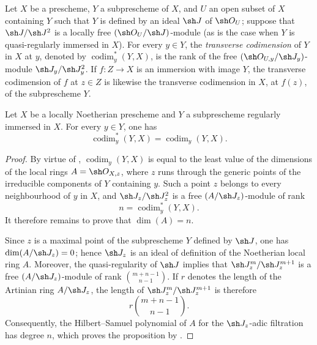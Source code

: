 \begin{definition}[19.1.3]
\label{IV.19.1.3}
Let $X$ be a prescheme, $Y$ a subprescheme of $X$, and $U$ an open subset of $X$ containing $Y$ such that $Y$ is defined by an ideal $\sh J$ of $\sh O_U$; suppose that $\sh J/\sh J^2$ is a locally free $(\sh O_U/\sh J)$-module (as is the case when $Y$ is quasi-regularly immersed in $X$). For every $y\in Y$, the \emph{transverse codimension} of $Y$ in $X$ at $y$, denoted by $\operatorname{codim}_y^*(Y,X)$, is the rank of the free $(\sh O_{U,y}/\sh J_y)$-module $\sh J_y/\sh J_y^2$. If $f:Z\to X$ is an immersion with image $Y$, the transverse codimension of $f$ at $z\in Z$ is likewise the transverse codimension in $X$, at $f(z)$, of the subprescheme $Y$.
\end{definition}

\begin{proposition}[19.1.4]
\label{IV.19.1.4}
Let $X$ be a locally Noetherian prescheme and $Y$ a subprescheme regularly immersed in $X$. For every $y\in Y$, one has
\begin{equation}
  \operatorname{codim}_y^*(Y,X)=\operatorname{codim}_y(Y,X).
  \tag{19.1.4.1}\label{IV.19.1.4.1}
\end{equation}
\end{proposition}

\begin{proof}
By virtue of , $\operatorname{codim}_y(Y,X)$ is equal to the least value of the dimensions of the local rings $A=\sh O_{X,z}$, where $z$ runs through the generic points of the irreducible components of $Y$ containing $y$. Such a point $z$ belongs to every neighbourhood of $y$ in $X$, and $\sh J_z/\sh J_z^2$ is a free $(A/\sh J_z)$-module of rank
\[
  n=\operatorname{codim}_y^*(Y,X).
\]
It therefore remains to prove that $\dim(A)=n$.


Since $z$ is a maximal point of the subprescheme $Y$ defined by $\sh J$, one has $\dim(A/\sh J_z)=0$; hence $\sh J_z$ is an ideal of definition of the Noetherian local ring $A$. Moreover, the quasi-regularity of $\sh J$ implies that $\sh J_z^m/\sh J_z^{m+1}$ is a free $(A/\sh J_z)$-module of rank $\binom{m+n-1}{n-1}$. If $r$ denotes the length of the Artinian ring $A/\sh J_z$, the length of $\sh J_z^m/\sh J_z^{m+1}$ is therefore
\[
  r\binom{m+n-1}{n-1}.
\]
Consequently, the Hilbert--Samuel polynomial of $A$ for the $\sh J_z$-adic filtration has degree $n$, which proves the proposition by .
\end{proof}

